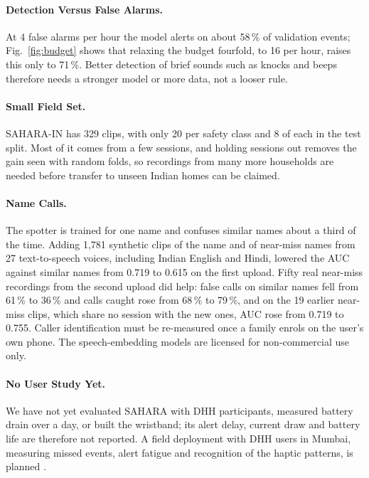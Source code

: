 \documentclass{svproc}
\begin{document}
\paragraph{Detection Versus False Alarms.} At 4 false alarms per hour the model alerts on about 58\,\% of validation events; Fig.~\ref{fig:budget} shows that relaxing the budget fourfold, to 16 per hour, raises this only to 71\,\%. Better detection of brief sounds such as knocks and beeps therefore needs a stronger model or more data, not a looser rule.

\paragraph{Small Field Set.} SAHARA-IN has 329 clips, with only 20 per safety class and 8 of each in the test split. Most of it comes from a few sessions, and holding sessions out removes the gain seen with random folds, so recordings from many more households are needed before transfer to unseen Indian homes can be claimed.

\paragraph{Name Calls.} The spotter is trained for one name and confuses similar names about a third of the time. Adding 1,781 synthetic clips of the name and of near-miss names from 27 text-to-speech voices, including Indian English and Hindi, lowered the AUC against similar names from 0.719 to 0.615 on the first upload. Fifty real near-miss recordings from the second upload did help: false calls on similar names fell from 61\,\% to 36\,\% and calls caught rose from 68\,\% to 79\,\%, and on the 19 earlier near-miss clips, which share no session with the new ones, AUC rose from 0.719 to 0.755. Caller identification must be re-measured once a family enrols on the user's own phone. The speech-embedding models are licensed for non-commercial use only.

\paragraph{No User Study Yet.} We have not yet evaluated SAHARA with DHH participants, measured battery drain over a day, or built the wristband; its alert delay, current draw and battery life are therefore not reported. A field deployment with DHH users in Mumbai, measuring missed events, alert fatigue and recognition of the haptic patterns, is planned \cite{findlater2019,jain2020homesound}.
\end{document}
